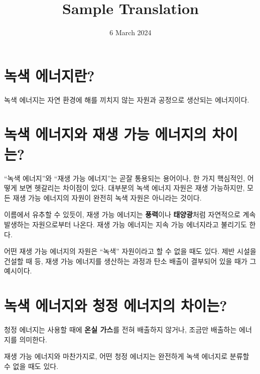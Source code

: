 \documentclass{translation}
\date{6 March 2024}
\title{Sample Translation}
\begin{document}
\section{녹색 에너지란?}
녹색 에너지는 자연 환경에 해를 끼치지 않는 자원과 공정으로 생산되는 에너지이다.

\section{녹색 에너지와 재생 가능 에너지의 차이는?}
``녹색 에너지''와 ``재생 가능 에너지''는 곧잘 통용되는 용어이나, 한 가지 핵심적인, 어떻게 보면 헷갈리는 차이점이 있다.
대부분의 녹색 에너지 자원은 재생 가능하지만, 모든 재생 가능 에너지의 자원이 완전히 녹색 자원은 아니라는 것이다.

이름에서 유추할 수 있듯이, 재생 가능 에너지는 \textbf{풍력}이나 \textbf{태양광}처럼 자연적으로 계속 발생하는 자원으로부터 나온다.
재생 가능 에너지는 지속 가능 에너지라고 불리기도 한다.

어떤 재생 가능 에너지의 자원은 ``녹색'' 자원이라고 할 수 없을 때도 있다.
제반 시설을 건설할 때 등, 재생 가능 에너지를 생산하는 과정과 탄소 배출이 결부되어 있을 때가 그 예시이다.

\section{녹색 에너지와 청정 에너지의 차이는?}
청정 에너지는 사용할 때에 \textbf{온실 가스}를 전혀 배출하지 않거나, 조금만 배출하는 에너지를 의미한다.

재생 가능 에너지와 마찬가지로, 어떤 청정 에너지는 완전하게 녹색 에너지로 분류할 수 없을 때도 있다.
\end{document}
